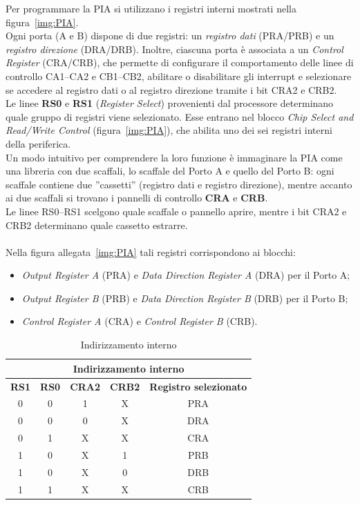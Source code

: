 Per programmare la PIA si utilizzano i registri interni mostrati nella figura~\ref{img:PIA}. \\
Ogni porta (A e B) dispone di due registri: un \textit{registro dati} (PRA/PRB) e un 
\textit{registro direzione} (DRA/DRB). Inoltre, ciascuna porta è associata a un 
\textit{Control Register} (CRA/CRB), che permette di configurare il comportamento delle linee 
di controllo CA1--CA2 e CB1--CB2, abilitare o disabilitare gli interrupt e selezionare se accedere 
al registro dati o al registro direzione tramite i bit CRA2 e CRB2. \\
Le linee \textbf{RS0} e \textbf{RS1} (\textit{Register Select}) provenienti dal processore 
determinano quale gruppo di registri viene selezionato. Esse entrano nel blocco 
\textit{Chip Select and Read/Write Control} (figura~\ref{img:PIA}), che abilita uno dei sei registri 
interni della periferica. \\ Un modo intuitivo per comprendere la loro funzione è immaginare la PIA come 
una libreria con due scaffali, lo scaffale del Porto A e quello del Porto B: ogni scaffale contiene due ''cassetti'' (registro dati e registro direzione), mentre accanto ai due 
scaffali si trovano i pannelli di controllo \textbf{CRA} e \textbf{CRB}. \\ Le linee RS0--RS1 scelgono 
quale scaffale o pannello aprire, mentre i bit CRA2 e CRB2 determinano quale cassetto estrarre.\\\\
Nella figura allegata~\ref{img:PIA} tali registri corrispondono ai blocchi:
\begin{itemize}
    \item \textit{Output Register A} (PRA) e \textit{Data Direction Register A} (DRA) per il Porto A;
    \item \textit{Output Register B} (PRB) e \textit{Data Direction Register B} (DRB) per il Porto B;
    \item \textit{Control Register A} (CRA) e \textit{Control Register B} (CRB).
\end{itemize}

\begin{table} [ht]
    \centering
    \begin{tabular}{|c|c|c|c|c|}
        \hline
        \multicolumn{5}{|c|}{\textbf{Indirizzamento interno}} \\ \hline
        \textbf{RS1} & \textbf{RS0} & \textbf{CRA2} & \textbf{CRB2} & \textbf{Registro selezionato}\\ \hline
        0       &0      &1      &X      &PRA    \\  \hline
        0       &0      &0      &X      &DRA    \\  \hline
        0       &1      &X      &X      &CRA    \\  \hline
        1       &0      &X      &1      &PRB    \\  \hline
        1       &0      &X      &0      &DRB    \\  \hline
        1       &1      &X      &X      &CRB    \\  \hline
    \end{tabular}
    \caption{Indirizzamento interno}
    \label{Tab:reg_ind_1}
\end{table}

